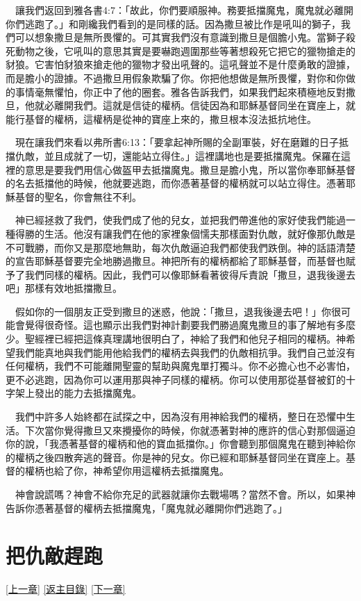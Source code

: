 \documentclass{book}
\begin{document}
　讓我們返回到雅各書4:7：「故此，你們要順服神。務要抵擋魔鬼，魔鬼就必離開你們逃跑了。」和剛纔我們看到的是同樣的話。因為撒旦被比作是吼叫的獅子，我們可以想象撒旦是無所畏懼的。可其實我們沒有意識到撒旦是個膽小鬼。當獅子殺死動物之後，它吼叫的意思其實是要嚇跑週圍那些等著想殺死它把它的獵物搶走的豺狼。它害怕豺狼來搶走他的獵物才發出吼聲的。這吼聲並不是什麼勇敢的證據，而是膽小的證據。不過撒旦用假象欺騙了你。你把他想做是無所畏懼，對你和你做的事情毫無懼怕，你正中了他的圈套。雅各告訴我們，如果我們起來積極地反對撒旦，他就必離開我們。這就是信徒的權柄。信徒因為和耶穌基督同坐在寶座上，就能行基督的權柄，這權柄是從神的寶座上來的，撒旦根本沒法抵抗地住。

　現在讓我們來看以弗所書6:13：「要拿起神所賜的全副軍裝，好在磨難的日子抵擋仇敵，並且成就了一切，還能站立得住。」這裡講地也是要抵擋魔鬼。保羅在這裡的意思是要我們用信心做盔甲去抵擋魔鬼。撒旦是膽小鬼，所以當你奉耶穌基督的名去抵擋他的時候，他就要逃跑，而你憑著基督的權柄就可以站立得住。憑著耶穌基督的聖名，你會無往不利。

　神已經拯救了我們，使我們成了他的兒女，並把我們帶進他的家好使我們能過一種得勝的生活。他沒有讓我們在他的家裡象個懦夫那樣面對仇敵，就好像那仇敵是不可戰勝，而你又是那麼地無助，每次仇敵逼迫我們都使我們跌倒。神的話語清楚的宣告耶穌基督要完全地勝過撒旦。神把所有的權柄都給了耶穌基督，而基督也賦予了我們同樣的權柄。因此，我們可以像耶穌看著彼得斥責說「撒旦，退我後邊去吧」那樣有效地抵擋撒旦。

　假如你的一個朋友正受到撒旦的迷惑，他說：「撒旦，退我後邊去吧！」你很可能會覺得很奇怪。這也顯示出我們對神計劃要我們勝過魔鬼撒旦的事了解地有多麼少。聖經裡已經把這條真理講地很明白了，神給了我們和他兒子相同的權柄。神希望我們能真地與我們能用他給我們的權柄去與我們的仇敵相抗爭。我們自己並沒有任何權柄，我們不可能離開聖靈的幫助與魔鬼單打獨斗。你不必擔心也不必害怕，更不必逃跑，因為你可以運用那與神子同樣的權柄。你可以使用那從基督被釘的十字架上發出的能力去抵擋魔鬼。

　我們中許多人始終都在試探之中，因為沒有用神給我們的權柄，整日在恐懼中生活。下次當你覺得撒旦又來攪擾你的時候，你就憑著對神的應許的信心對那個逼迫你的說，「我憑著基督的權柄和他的寶血抵擋你。」你會聽到那個魔鬼在聽到神給你的權柄之後四散奔逃的聲音。你是神的兒女。你已經和耶穌基督同坐在寶座上。基督的權柄也給了你，神希望你用這權柄去抵擋魔鬼。

　神會說謊嗎？神會不給你充足的武器就讓你去戰場嗎？當然不會。所以，如果神告訴你憑著基督的權柄去抵擋魔鬼，「魔鬼就必離開你們逃跑了。」

\chapter{把仇敵趕跑}
\label{sec:ch18}
\hyperref[sec:ch17]{[上一章]}
\hyperlink{toc}{[返主目錄]}
\hyperref[sec:ch19]{[下一章]}
\end{document}
